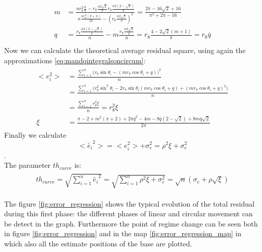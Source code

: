 \begin{itemize}
\begin{itemize}
\begin{align}
\begin{split}
m &= \frac{nr_{8}^2\frac{n}{\pi} - r_{8}\frac{n2\sqrt{2}}{\pi} r_{8}\frac{n2(2-\sqrt{2})}{\pi} }{n\frac{nr_{8}^2(2+\pi)}{2\pi} -(r_{8}\frac{n2\sqrt{2}}{\pi})^2} = \frac{2\pi - 16\sqrt{2} + 16}{\pi^2 + 2\pi - 16}  \\[10pt]
q &= \frac{ r_{8}\frac{n2(2-\sqrt{2})}{\pi} }{n} - m\frac{ r_{8}\frac{n2\sqrt{2}}{\pi}}{n} = r_{8} \frac{4-2\sqrt{2}(m+1)}{\pi} = r_{8}\bar{q} \\
\end{split}
\label{eq:mandqcirum}
\end{align}
Now we can calculate the theoretical average residual square, using again the approximations  \ref{eq:mandqintegralsoncircum}:
\begin{align*}
\begin{split}
<e_i^2> &= \frac{\sum_{i = 1}^{n}{\Big(r_{8}\sin{\theta_i} - (mr_{8}\cos{\theta_i} + q)\Big)^2}}{n}\\
&= \frac{\sum_{i = 1}^{n}{\Big(r_{8}^2\sin^2{\theta_i} - 2r_{8}\sin{\theta_i}(mr_{8}\cos{\theta_i} + q) + (mr_{8}\cos{\theta_i} + q)^2\Big)}}{n}\\
& = \frac{\sum_{i = 1}^{n} r_{8}^2 \xi }{n} = r_{8}^2 \xi \\
\xi &= \frac{\pi - 2 + m^2(\pi+2) + 2\pi\bar{q}^2 - 4m -8\bar{q}(2-\sqrt{2}) + 8m\bar{q}\sqrt{2}}{2\pi}
\end{split}
\end{align*} 
Finally we calculate $$<\tilde{e_i}^2>  = <e_i^2> + \sigma_e^2 = \rho^2 \xi  + \sigma_e^2 $$. \\
The parameter $th_{curve}$ is:
\begin{align}
\begin{split}
th_{curve} = \sqrt{\sum_{i=1}^{n}{\tilde{e_i}^2}} = \sqrt{\sum_{i=1}^{n}{\rho^2 \xi  + \sigma_e^2}} = \sqrt{n}(\sigma_e + \rho\sqrt{\xi})
\end{split}
\end{align}
\end{itemize}
\end{itemize}
The figure \ref{fig:error_regression} shows the typical evolution of the total residual during this first phase: the different phases of linear and circular movement can be detect in the graph. Furthermore the point of regime change can be seen both in figure \ref{fig:error_regression}  and in the map \ref{fig:error_regression_map} in which also all the estimate positions of the base are plotted.\\


